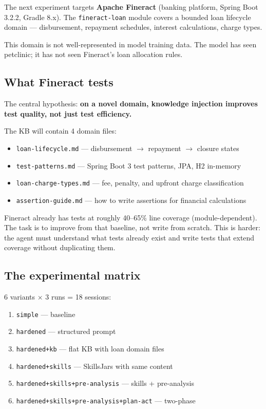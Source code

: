 \documentclass[11pt,a4paper]{article}
\begin{document}
The next experiment targets \textbf{Apache Fineract} (banking platform, Spring Boot 3.2.2,
Gradle 8.x). The \texttt{fineract-loan} module covers a bounded loan lifecycle domain ---
disbursement, repayment schedules, interest calculations, charge types.

This domain is not well-represented in model training data.
The model has seen petclinic; it has not seen Fineract's loan allocation rules.

\subsection*{What Fineract tests}

The central hypothesis: \textbf{on a novel domain, knowledge injection improves
test quality, not just test efficiency.}

The KB will contain 4 domain files:
\begin{itemize}
  \item \texttt{loan-lifecycle.md} --- disbursement $\to$ repayment $\to$ closure states
  \item \texttt{test-patterns.md} --- Spring Boot 3 test patterns, JPA, H2 in-memory
  \item \texttt{loan-charge-types.md} --- fee, penalty, and upfront charge classification
  \item \texttt{assertion-guide.md} --- how to write assertions for financial calculations
\end{itemize}

Fineract already has tests at roughly 40--65\% line coverage (module-dependent).
The task is to improve from that baseline, not write from scratch.
This is harder: the agent must understand what tests already exist
and write tests that extend coverage without duplicating them.

\subsection*{The experimental matrix}

6 variants $\times$ 3 runs = 18 sessions:
\begin{enumerate}
  \item \texttt{simple} --- baseline
  \item \texttt{hardened} --- structured prompt
  \item \texttt{hardened+kb} --- flat KB with loan domain files
  \item \texttt{hardened+skills} --- SkillsJars with same content
  \item \texttt{hardened+skills+pre-analysis} --- skills + pre-analysis
  \item \texttt{hardened+skills+pre-analysis+plan-act} --- two-phase
\end{enumerate}
\end{document}
